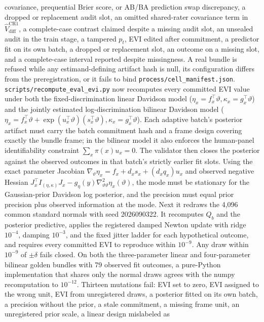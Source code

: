 \documentclass{article}
\begin{document}
covariance, prequential Brier score, or AB/BA prediction swap discrepancy, a dropped or replacement audit slot, an omitted shared-rater
covariance term in $\widehat V_{\mathrm{diff}}^{\mathrm{CR1}}$, a complete-case
contrast claimed despite a missing audit slot, an unsealed audit in the train
stage, a tampered $p_t$, EVI
edited after commitment, a
predictor fit on its own batch, a dropped or replacement slot, an outcome on a
missing slot, and a complete-case interval reported despite missingness. A
real bundle is refused while any estimand-defining artifact hash is null, its
configuration differs from the preregistration, or it fails to bind
\texttt{process/cell\_manifest.json}.
\texttt{scripts/recompute\_eval\_evi.py} now recomputes every committed EVI
value under both the fixed-discrimination linear Davidson model
($\eta_x=f_x^\top\vartheta,\kappa_x=g_x^\top\vartheta$) and the jointly
estimated log-discrimination bilinear Davidson model
($\eta_x=f_x^\top\vartheta+\exp(u_x^\top\vartheta)(s_x^\top\vartheta),
\kappa_x=g_x^\top\vartheta$). Each adaptive batch's posterior artifact must carry the batch
commitment hash and a frame design covering exactly the bundle frame; in the
bilinear model it also enforces the human-panel identifiability constraint
$\sum_x\pi(x)u_x=0$. The
validator then closes the posterior against the observed outcomes in that
batch's strictly earlier fit slots. Using the exact parameter Jacobian
$\nabla_\vartheta\eta_x=f_x+d_xs_x+(d_xq_x)u_x$ and observed negative Hessian
$J_x^\top I_{(\eta,\kappa)}J_x-g_\eta(y)\nabla^2_{\vartheta\vartheta}\eta_x(\vartheta)$,
the mode must be stationary for the
Gaussian-prior Davidson log posterior, and the precision must equal prior
precision plus observed information at the mode. Next it redraws the 4,096
common standard normals with seed 2026090322. It recomputes $Q_b$ and the
posterior predictive, applies the registered damped Newton update with ridge
$10^{-4}$, damping $10^{-3}$, and the fixed jitter ladder for each
hypothetical outcome, and requires every committed EVI to reproduce within
$10^{-9}$. Any draw within $10^{-9}$ of $\pm\delta$ fails closed. On both the
three-parameter linear and four-parameter bilinear golden bundles with 79
observed fit outcomes, a
pure-Python implementation that shares only the normal draws agrees with the
numpy recomputation to $10^{-12}$. Thirteen mutations fail: EVI set to zero, EVI
assigned to the wrong unit, EVI from unregistered draws, a posterior fitted on
its own batch, a precision without the prior, a stale commitment, a missing
frame unit, an unregistered prior scale, a linear design mislabeled as
\end{document}
